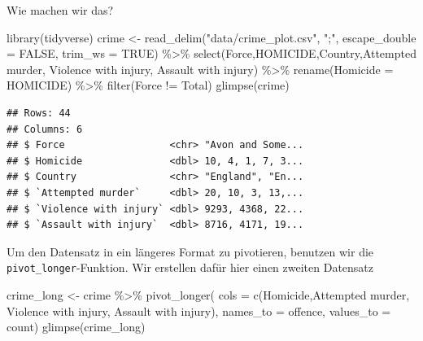 \documentclass[
]{book}
\newenvironment{Shaded}{\begin{snugshade}}{\end{snugshade}}
\newcommand{\AttributeTok}[1]{\textcolor[rgb]{0.77,0.63,0.00}{#1}}
\newcommand{\ConstantTok}[1]{\textcolor[rgb]{0.00,0.00,0.00}{#1}}
\newcommand{\FunctionTok}[1]{\textcolor[rgb]{0.00,0.00,0.00}{#1}}
\newcommand{\NormalTok}[1]{#1}
\newcommand{\OtherTok}[1]{\textcolor[rgb]{0.56,0.35,0.01}{#1}}
\newcommand{\SpecialCharTok}[1]{\textcolor[rgb]{0.00,0.00,0.00}{#1}}
\newcommand{\StringTok}[1]{\textcolor[rgb]{0.31,0.60,0.02}{#1}}
\begin{document}
Wie machen wir das?

\begin{Shaded}
\begin{Highlighting}[]
\FunctionTok{library}\NormalTok{(tidyverse)}
\NormalTok{crime }\OtherTok{\textless{}{-}} \FunctionTok{read\_delim}\NormalTok{(}\StringTok{"data/crime\_plot.csv"}\NormalTok{, }
                    \StringTok{";"}\NormalTok{, }\AttributeTok{escape\_double =} \ConstantTok{FALSE}\NormalTok{, }\AttributeTok{trim\_ws =} \ConstantTok{TRUE}\NormalTok{) }\SpecialCharTok{\%\textgreater{}\%} 
  \FunctionTok{select}\NormalTok{(Force,HOMICIDE,Country,}\StringTok{\textasciigrave{}}\AttributeTok{Attempted murder}\StringTok{\textasciigrave{}}\NormalTok{, }
         \StringTok{\textasciigrave{}}\AttributeTok{Violence with injury}\StringTok{\textasciigrave{}}\NormalTok{, }\StringTok{\textasciigrave{}}\AttributeTok{Assault with injury}\StringTok{\textasciigrave{}}\NormalTok{) }\SpecialCharTok{\%\textgreater{}\%} 
  \FunctionTok{rename}\NormalTok{(}\StringTok{\textquotesingle{}Homicide\textquotesingle{}} \OtherTok{=} \StringTok{\textquotesingle{}HOMICIDE\textquotesingle{}}\NormalTok{) }\SpecialCharTok{\%\textgreater{}\%} 
  \FunctionTok{filter}\NormalTok{(Force }\SpecialCharTok{!=} \StringTok{\textquotesingle{}Total\textquotesingle{}}\NormalTok{)}
\FunctionTok{glimpse}\NormalTok{(crime)}
\end{Highlighting}
\end{Shaded}

\begin{verbatim}
## Rows: 44
## Columns: 6
## $ Force                  <chr> "Avon and Some...
## $ Homicide               <dbl> 10, 4, 1, 7, 3...
## $ Country                <chr> "England", "En...
## $ `Attempted murder`     <dbl> 20, 10, 3, 13,...
## $ `Violence with injury` <dbl> 9293, 4368, 22...
## $ `Assault with injury`  <dbl> 8716, 4171, 19...
\end{verbatim}

Um den Datensatz in ein längeres Format zu pivotieren, benutzen wir die \texttt{pivot\_longer}-Funktion.
Wir erstellen dafür hier einen zweiten Datensatz

\begin{Shaded}
\begin{Highlighting}[]
\NormalTok{crime\_long }\OtherTok{\textless{}{-}}\NormalTok{ crime }\SpecialCharTok{\%\textgreater{}\%} 
  \FunctionTok{pivot\_longer}\NormalTok{(}
    \AttributeTok{cols =} \FunctionTok{c}\NormalTok{(}\StringTok{\textquotesingle{}Homicide\textquotesingle{}}\NormalTok{,}\StringTok{\textquotesingle{}Attempted murder\textquotesingle{}}\NormalTok{, }
             \StringTok{\textquotesingle{}Violence with injury\textquotesingle{}}\NormalTok{, }\StringTok{\textquotesingle{}Assault with injury\textquotesingle{}}\NormalTok{),}
    \AttributeTok{names\_to =} \StringTok{\textquotesingle{}offence\textquotesingle{}}\NormalTok{, }
    \AttributeTok{values\_to =} \StringTok{\textquotesingle{}count\textquotesingle{}}\NormalTok{)}
\FunctionTok{glimpse}\NormalTok{(crime\_long)}
\end{Highlighting}
\end{Shaded}
\end{document}
